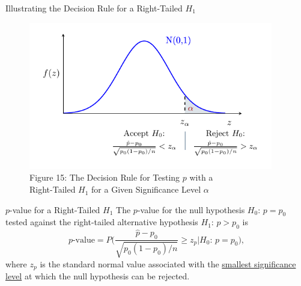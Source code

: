 \documentclass[pdf]{beamer}
\theoremstyle{remark}
\theoremstyle{definition}
\begin{document}
\begin{frame}[t]{Illustrating the Decision Rule for a Right-Tailed $H_1$ }
\begin{figure}[htbp]
    \centering
    \captionsetup{justification=centering}
    \includegraphics[clip, trim=0.5cm 0.5cm 0.0cm 0cm, width=0.95\textwidth]{Hypothesis_Testing_Module_9_pZ1.pdf}  
    \caption{Figure {\color{franklinblue} 15}: The Decision Rule for Testing $p$ with a \\Right-Tailed $H_1$ for a Given Significance Level $\alpha$}
    \label{fig:gauss7}
\end{figure}
\end{frame}

\begin{frame}[t]{$p$-value for a Right-Tailed $H_1$}
The $p$-value for the null hypothesis $H_0\text{: }  p = p_0$ tested against the right-tailed alternative hypothesis $H_1\text{: }  p > p_0$ is
\begin{equation}
p\text{-value} = P\bigg( \frac{\hat{p} - p_0}{\sqrt{p_0(1-p_0)/ n}} \geq z_{p} | H_0\text{: }  p = p_0 \bigg),
\end{equation}
where $z_p$ is the standard normal value associated with the \underline{smallest significance level} at which the null hypothesis can be rejected.
\end{frame}
\end{document}

